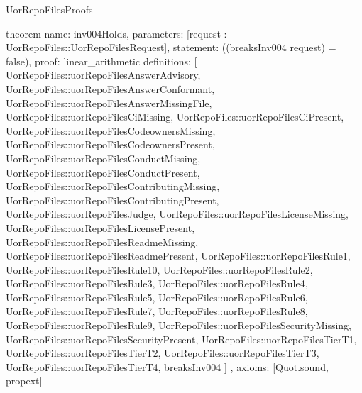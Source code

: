 \begin{lexlean}{UorRepoFilesProofs}
\begin{semanticmodule}
theorem{
  name: inv004Holds,
  parameters: [request : UorRepoFiles::UorRepoFilesRequest],
  statement: ((breaksInv004 request) = false),
  proof: linear_arithmetic{
    definitions: [
      UorRepoFiles::uorRepoFilesAnswerAdvisory,
      UorRepoFiles::uorRepoFilesAnswerConformant,
      UorRepoFiles::uorRepoFilesAnswerMissingFile,
      UorRepoFiles::uorRepoFilesCiMissing,
      UorRepoFiles::uorRepoFilesCiPresent,
      UorRepoFiles::uorRepoFilesCodeownersMissing,
      UorRepoFiles::uorRepoFilesCodeownersPresent,
      UorRepoFiles::uorRepoFilesConductMissing,
      UorRepoFiles::uorRepoFilesConductPresent,
      UorRepoFiles::uorRepoFilesContributingMissing,
      UorRepoFiles::uorRepoFilesContributingPresent,
      UorRepoFiles::uorRepoFilesJudge,
      UorRepoFiles::uorRepoFilesLicenseMissing,
      UorRepoFiles::uorRepoFilesLicensePresent,
      UorRepoFiles::uorRepoFilesReadmeMissing,
      UorRepoFiles::uorRepoFilesReadmePresent,
      UorRepoFiles::uorRepoFilesRule1,
      UorRepoFiles::uorRepoFilesRule10,
      UorRepoFiles::uorRepoFilesRule2,
      UorRepoFiles::uorRepoFilesRule3,
      UorRepoFiles::uorRepoFilesRule4,
      UorRepoFiles::uorRepoFilesRule5,
      UorRepoFiles::uorRepoFilesRule6,
      UorRepoFiles::uorRepoFilesRule7,
      UorRepoFiles::uorRepoFilesRule8,
      UorRepoFiles::uorRepoFilesRule9,
      UorRepoFiles::uorRepoFilesSecurityMissing,
      UorRepoFiles::uorRepoFilesSecurityPresent,
      UorRepoFiles::uorRepoFilesTierT1,
      UorRepoFiles::uorRepoFilesTierT2,
      UorRepoFiles::uorRepoFilesTierT3,
      UorRepoFiles::uorRepoFilesTierT4,
      breaksInv004
    ]
  },
  axioms: [Quot.sound, propext]
}
\end{semanticmodule}
\end{lexlean}
